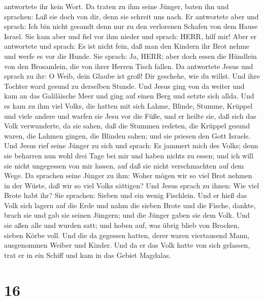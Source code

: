 antwortete ihr kein Wort. Da traten zu ihm seine Jünger, baten ihn und
sprachen: Laß sie doch von dir, denn sie schreit uns nach. 
Er antwortete aber und sprach: Ich bin nicht gesandt denn nur zu den
verlorenen Schafen von dem Hause Israel.  Sie kam aber und
fiel vor ihm nieder und sprach: HERR, hilf mir!  Aber er
antwortete und sprach: Es ist nicht fein, daß man den Kindern ihr Brot
nehme und werfe es vor die Hunde.  Sie sprach: Ja, HERR;
aber doch essen die Hündlein von den Brosamlein, die von ihrer Herren
Tisch fallen.  Da antwortete Jesus und sprach zu ihr: O
Weib, dein Glaube ist groß! Dir geschehe, wie du willst. Und ihre
Tochter ward gesund zu derselben Stunde.  Und Jesus ging
von da weiter und kam an das Galiläische Meer und ging auf einen Berg
und setzte sich allda.  Und es kam zu ihm viel Volks, die
hatten mit sich Lahme, Blinde, Stumme, Krüppel und viele andere und
warfen sie Jesu vor die Füße, und er heilte sie,  daß sich
das Volk verwunderte, da sie sahen, daß die Stummen redeten, die Krüppel
gesund waren, die Lahmen gingen, die Blinden sahen; und sie priesen den
Gott Israels.  Und Jesus rief seine Jünger zu sich und
sprach: Es jammert mich des Volks; denn sie beharren nun wohl drei Tage
bei mir und haben nichts zu essen; und ich will sie nicht ungegessen von
mir lassen, auf daß sie nicht verschmachten auf dem Wege. 
Da sprachen seine Jünger zu ihm: Woher mögen wir so viel Brot nehmen in
der Wüste, daß wir so viel Volks sättigen?  Und Jesus
sprach zu ihnen: Wie viel Brote habt ihr? Sie sprachen: Sieben und ein
wenig Fischlein.  Und er hieß das Volk sich lagern auf die
Erde  und nahm die sieben Brote und die Fische, dankte,
brach sie und gab sie seinen Jüngern; und die Jünger gaben sie dem Volk.
 Und sie aßen alle und wurden satt; und hoben auf, was
übrig blieb von Brocken, sieben Körbe voll.  Und die da
gegessen hatten, derer waren viertausend Mann, ausgenommen Weiber und
Kinder.  Und da er das Volk hatte von sich gelassen, trat
er in ein Schiff und kam in das Gebiet Magdalas.

\hypertarget{section-15}{%
\section{16}\label{section-15}}


